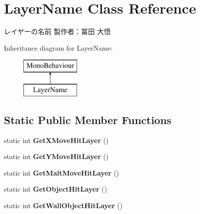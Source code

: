 \hypertarget{class_layer_name}{}\section{Layer\+Name Class Reference}
\label{class_layer_name}


レイヤーの名前 製作者：冨田 大悟  


Inheritance diagram for Layer\+Name\+:\begin{figure}[H]
\begin{center}
\leavevmode
\includegraphics[height=2.000000cm]{class_layer_name}
\end{center}
\end{figure}
\subsection*{Static Public Member Functions}
\begin{DoxyCompactItemize}
\item 
\mbox{\label{class_layer_name_a1ad281d7b5e37c9208d87cccc5e0c860}} 
static int {\bfseries Get\+X\+Move\+Hit\+Layer} ()
\item 
\mbox{\label{class_layer_name_a2630ddc7e12f2fe96133ae1f30273821}} 
static int {\bfseries Get\+Y\+Move\+Hit\+Layer} ()
\item 
\mbox{\label{class_layer_name_a5d35b68c10e85cb75d46ec90b35358dd}} 
static int {\bfseries Get\+Malt\+Move\+Hit\+Layer} ()
\item 
\mbox{\label{class_layer_name_a0e24b158cc69c25da3457f3d230e87cd}} 
static int {\bfseries Get\+Object\+Hit\+Layer} ()
\item 
\mbox{\label{class_layer_name_a57c392e6b2d6ad979ad5c4d244ff07c9}} 
static int {\bfseries Get\+Wall\+Object\+Hit\+Layer} ()
\end{DoxyCompactItemize}
